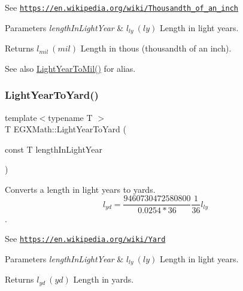 See \href{https://en.wikipedia.org/wiki/Thousandth_of_an_inch}{\tt https\+://en.\+wikipedia.\+org/wiki/\+Thousandth\+\_\+of\+\_\+an\+\_\+inch} 
\begin{DoxyParams}{Parameters}
{\em length\+In\+Light\+Year} & $ l_{ly}\ (ly)$ Length in light years. \\
\hline
\end{DoxyParams}
\begin{DoxyReturn}{Returns}
$ l_{mil}\ (mil)$ Length in thous (thousandth of an inch). 
\end{DoxyReturn}
\begin{DoxySeeAlso}{See also}
\mbox{\hyperlink{group___e_g_x_math-_conversions-_length_conversions-_astronomical-_light_year-_imperial_ga980a3d37f73ebc5f217366ee01e7b4ae}{Light\+Year\+To\+Mil()}} for alias. 
\end{DoxySeeAlso}
\mbox{\label{group___e_g_x_math-_conversions-_length_conversions-_astronomical-_light_year-_imperial_ga78ce9f584c98c3ad8c4daaebb76030d3}} 
\subsubsection{\texorpdfstring{Light\+Year\+To\+Yard()}{LightYearToYard()}}
{\footnotesize\ttfamily template$<$typename T $>$ \\
T E\+G\+X\+Math\+::\+Light\+Year\+To\+Yard (\begin{DoxyParamCaption}\item[{const T}]{length\+In\+Light\+Year }\end{DoxyParamCaption})}



Converts a length in light years to yards. \[ l_{yd}= \frac{9460730472580800}{0.0254 * 36} \frac{1}{36} l_{ly} \]. 

See \href{https://en.wikipedia.org/wiki/Yard}{\tt https\+://en.\+wikipedia.\+org/wiki/\+Yard} 
\begin{DoxyParams}{Parameters}
{\em length\+In\+Light\+Year} & $ l_{ly}\ (ly)$ Length in light years. \\
\hline
\end{DoxyParams}
\begin{DoxyReturn}{Returns}
$ l_{yd}\ (yd)$ Length in yards. 
\end{DoxyReturn}

